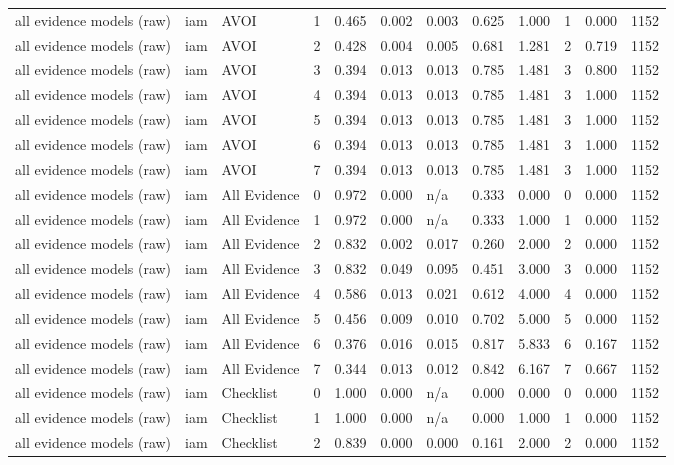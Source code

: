 \begin{table}[!ht]
{\begin{tabular}{llllllllllll}
all evidence models (raw) & iam & AVOI & 1 & 0.465 & 0.002 & 0.003 & 0.625 & 1.000 & 1 & 0.000 & 1152 \\
all evidence models (raw) & iam & AVOI & 2 & 0.428 & 0.004 & 0.005 & 0.681 & 1.281 & 2 & 0.719 & 1152 \\
all evidence models (raw) & iam & AVOI & 3 & 0.394 & 0.013 & 0.013 & 0.785 & 1.481 & 3 & 0.800 & 1152 \\
all evidence models (raw) & iam & AVOI & 4 & 0.394 & 0.013 & 0.013 & 0.785 & 1.481 & 3 & 1.000 & 1152 \\
all evidence models (raw) & iam & AVOI & 5 & 0.394 & 0.013 & 0.013 & 0.785 & 1.481 & 3 & 1.000 & 1152 \\
all evidence models (raw) & iam & AVOI & 6 & 0.394 & 0.013 & 0.013 & 0.785 & 1.481 & 3 & 1.000 & 1152 \\
all evidence models (raw) & iam & AVOI & 7 & 0.394 & 0.013 & 0.013 & 0.785 & 1.481 & 3 & 1.000 & 1152 \\
all evidence models (raw) & iam & All Evidence & 0 & 0.972 & 0.000 & n/a & 0.333 & 0.000 & 0 & 0.000 & 1152 \\
all evidence models (raw) & iam & All Evidence & 1 & 0.972 & 0.000 & n/a & 0.333 & 1.000 & 1 & 0.000 & 1152 \\
all evidence models (raw) & iam & All Evidence & 2 & 0.832 & 0.002 & 0.017 & 0.260 & 2.000 & 2 & 0.000 & 1152 \\
all evidence models (raw) & iam & All Evidence & 3 & 0.832 & 0.049 & 0.095 & 0.451 & 3.000 & 3 & 0.000 & 1152 \\
all evidence models (raw) & iam & All Evidence & 4 & 0.586 & 0.013 & 0.021 & 0.612 & 4.000 & 4 & 0.000 & 1152 \\
all evidence models (raw) & iam & All Evidence & 5 & 0.456 & 0.009 & 0.010 & 0.702 & 5.000 & 5 & 0.000 & 1152 \\
all evidence models (raw) & iam & All Evidence & 6 & 0.376 & 0.016 & 0.015 & 0.817 & 5.833 & 6 & 0.167 & 1152 \\
all evidence models (raw) & iam & All Evidence & 7 & 0.344 & 0.013 & 0.012 & 0.842 & 6.167 & 7 & 0.667 & 1152 \\
all evidence models (raw) & iam & Checklist & 0 & 1.000 & 0.000 & n/a & 0.000 & 0.000 & 0 & 0.000 & 1152 \\
all evidence models (raw) & iam & Checklist & 1 & 1.000 & 0.000 & n/a & 0.000 & 1.000 & 1 & 0.000 & 1152 \\
all evidence models (raw) & iam & Checklist & 2 & 0.839 & 0.000 & 0.000 & 0.161 & 2.000 & 2 & 0.000 & 1152 \\

\end{tabular}}
\end{table}
